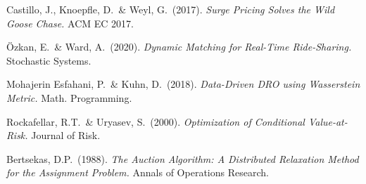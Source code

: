 \documentclass[12pt,a4paper]{article}
\begin{document}
\begin{enumerate}[label={[\arabic*]}, leftmargin=3em, itemsep=2pt]
  \item Castillo, J., Knoepfle, D.\ \& Weyl, G.\ (2017).
        \textit{Surge Pricing Solves the Wild Goose Chase.}
        ACM EC 2017.
  \item Özkan, E.\ \& Ward, A.\ (2020).
        \textit{Dynamic Matching for Real-Time Ride-Sharing.}
        Stochastic Systems.
  \item Mohajerin Esfahani, P.\ \& Kuhn, D.\ (2018).
        \textit{Data-Driven DRO using Wasserstein Metric.} Math. Programming.
  \item Rockafellar, R.T.\ \& Uryasev, S.\ (2000).
        \textit{Optimization of Conditional Value-at-Risk.}
        Journal of Risk.
  \item Bertsekas, D.P.\ (1988).
        \textit{The Auction Algorithm: A Distributed Relaxation Method
        for the Assignment Problem.} Annals of Operations Research.
\end{enumerate}
\end{document}
